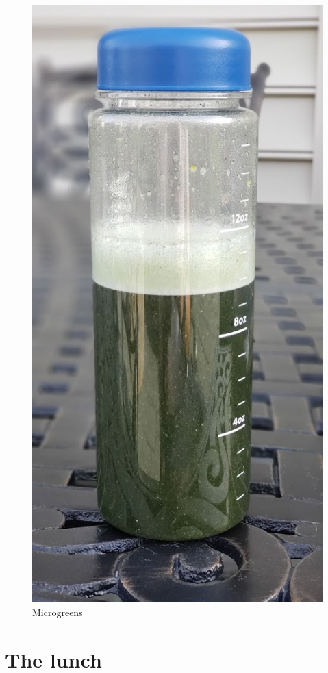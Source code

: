\documentclass[
  oneside]{book}
\begin{document}
\begin{figure}
\centering
\includegraphics{pictures/microgreens.jpg}
\caption{Microgreens}
\end{figure}

\hypertarget{the-lunch}{%
\section{The lunch}\label{the-lunch}}
\end{document}
